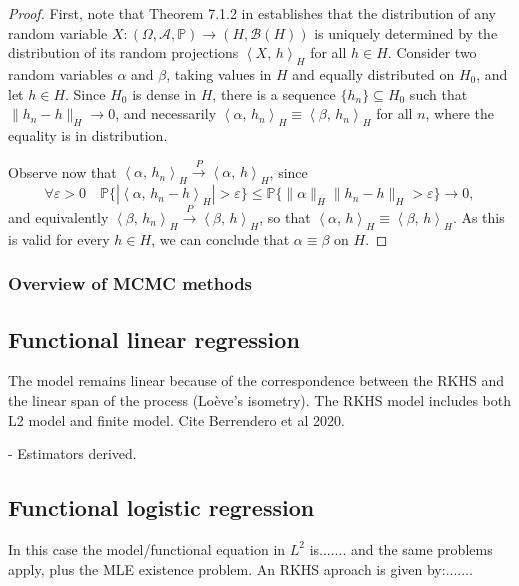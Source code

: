 \documentclass[ba]{imsart}
\numberwithin{equation}{section}
\theoremstyle{plain}
\renewcommand{\epsilon}{\varepsilon}
\newcommand\dotprod[2]{\left\langle #1,\, #2 \right\rangle}
\newenvironment{comment}
{
\noindent \em \color{red}
}
{
\color{black}
}
\begin{document}
\begin{proof}

First, note that Theorem 7.1.2 in \citet[p.~177]{hsing2015theoretical} establishes that the distribution of any random variable \(X: (\Omega, \mathcal A, \mathbb{P})\to (H, \mathcal B(H))\) is uniquely determined by the distribution of its random projections \(\dotprod{X}{h}_H\) for all \(h \in H\).
Consider two random variables \(\alpha\) and \(\beta\), taking values in \(H\) and equally distributed on \(H_0\), and let \(h \in H\). Since \(H_0\) is dense in \(H\), there is a sequence \(\{h_n\}\subseteq H_0\) such that \(\|h_n - h\|_H \to 0\), and necessarily \(\dotprod{\alpha}{h_n}_H \equiv \dotprod{\beta}{h_n}_H\) for all \(n\), where the equality is in distribution.

Observe now that \(\dotprod{\alpha}{h_n}_H \overset{P}{\to} \dotprod{\alpha}{h}_H\), since
\[
\forall \epsilon > 0 \quad \mathbb{P}\{|\dotprod{\alpha}{h_n - h}_H| > \epsilon\} \leq \mathbb{P}\{\|\alpha\|_H \|h_n - h\|_H > \epsilon\} \to 0,
\]
and equivalently \(\dotprod{\beta}{h_n}_H \overset{P}{\to} \dotprod{\beta}{h}_H\), so that \(\dotprod{\alpha}{h}_H \equiv \dotprod{\beta}{h}_H\). As this is valid for every \(h \in H\), we can conclude that \(\alpha \equiv \beta\) on \(H\).
\end{proof}

\subsubsection{Overview of MCMC methods}

\subsection{Functional linear regression}
 The model remains linear because of the correspondence between the RKHS and the linear span of the process (Loève’s isometry). The RKHS model includes both L2 model and finite model. Cite Berrendero et al 2020.

\begin{comment}
  - Estimators derived.
\end{comment}

\subsection{Functional logistic regression}

In this case the model/functional equation in $L^2$ is....... and the same problems apply, plus the MLE existence problem. An RKHS aproach is given by:.......
\end{document}
